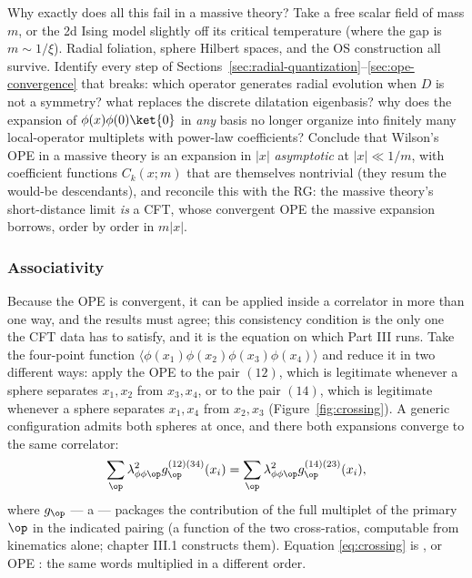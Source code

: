 \begin{exercise}[thinker]
\label{exr:ope-massive}
Why exactly does all this fail in a massive theory? Take a free scalar field
of mass $m$, or the 2d Ising model slightly off its critical temperature
(where the gap is $m \sim 1/\xi$). Radial foliation, sphere
Hilbert spaces, and the OS construction all survive. Identify every step of
Sections~\ref{sec:radial-quantization}--\ref{sec:ope-convergence} that breaks:
which operator generates radial evolution when $D$ is not a symmetry? what
replaces the discrete dilatation eigenbasis? why does the expansion of
$\phi(x)\phi(0)\ket{0}$ in \emph{any} basis no longer organize into finitely
many local-operator multiplets with power-law coefficients? Conclude that
Wilson's OPE in a massive theory is an expansion in $|x|$ \emph{asymptotic} at
$|x| \ll 1/m$, with coefficient functions $C_k(x; m)$ that are themselves
nontrivial (they resum the would-be descendants), and reconcile this with the
RG: the massive theory's short-distance limit \emph{is} a CFT, whose convergent
OPE the massive expansion borrows, order by order in $m|x|$.
\end{exercise}

\subsubsection{Associativity}
\label{sec:crossing}

Because the OPE is convergent, it can be applied inside a correlator in more
than one way, and the results must agree; this consistency condition is the
only one the CFT data has to satisfy, and it is the equation on which Part
III runs. Take the four-point function
$\langle\phi(x_1)\phi(x_2)\phi(x_3)\phi(x_4)\rangle$ and reduce it in two
different ways: apply the OPE to the pair $(12)$, which is legitimate
whenever a sphere separates $x_1, x_2$ from $x_3, x_4$, or to the pair
$(14)$, which is legitimate whenever a sphere separates $x_1, x_4$ from
$x_2, x_3$ (Figure~\ref{fig:crossing}). A generic configuration admits both
spheres at once, and there both expansions converge to the same correlator:
\begin{equation}
\sum_{\op} \lambda_{\phi\phi\op}^2
g_{\op}^{(12)(34)}(x_i)
=
\sum_{\op} \lambda_{\phi\phi\op}^2
g_{\op}^{(14)(23)}(x_i),
\label{eq:crossing}
\end{equation}
where $g_\op$ --- a  --- packages the contribution of
the full multiplet of the primary $\op$ in the indicated pairing (a function
of the two cross-ratios, computable from kinematics alone; chapter III.1
constructs them). Equation \eqref{eq:crossing} is ,
or OPE : the same words multiplied in a different order.

